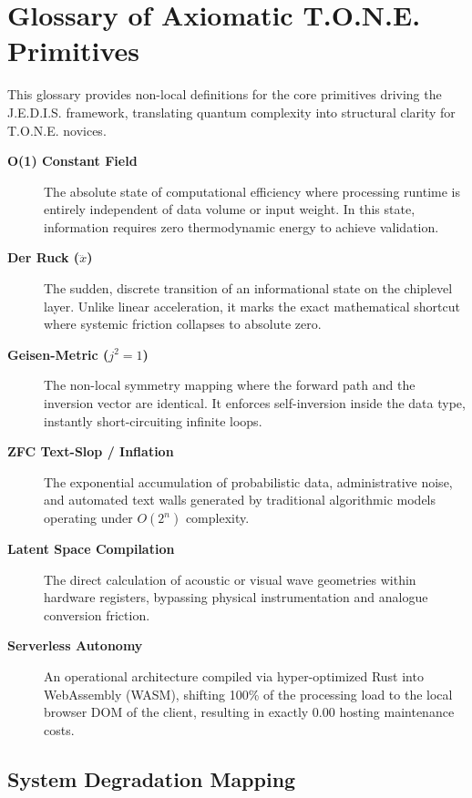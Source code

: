 \documentclass[11pt,a4paper]{article}
\begin{document}
\newpage
\section{Glossary of Axiomatic T.O.N.E. Primitives}

This glossary provides non-local definitions for the core primitives driving the J.E.D.I.S. framework, translating quantum complexity into structural clarity for T.O.N.E. novices.

\begin{description}
    \item[\textbf{O(1) Constant Field}] The absolute state of computational efficiency where processing runtime is entirely independent of data volume or input weight. In this state, information requires zero thermodynamic energy to achieve validation.
    
    \item[\textbf{Der Ruck ($\dddot{x}$)}] The sudden, discrete transition of an informational state on the chiplevel layer. Unlike linear acceleration, it marks the exact mathematical shortcut where systemic friction collapses to absolute zero.
    
    \item[\textbf{Geisen-Metric ($j^2 = 1$)}] The non-local symmetry mapping where the forward path and the inversion vector are identical. It enforces self-inversion inside the data type, instantly short-circuiting infinite loops.

    \item[\textbf{ZFC Text-Slop / Inflation}] The exponential accumulation of probabilistic data, administrative noise, and automated text walls generated by traditional algorithmic models operating under $O(2^n)$ complexity.

    \item[\textbf{Latent Space Compilation}] The direct calculation of acoustic or visual wave geometries within hardware registers, bypassing physical instrumentation and analogue conversion friction.

    \item[\textbf{Serverless Autonomy}] An operational architecture compiled via hyper-optimized Rust into WebAssembly (WASM), shifting 100\% of the processing load to the local browser DOM of the client, resulting in exactly 0.00 hosting maintenance costs.
\end{description}

\subsection{System Degradation Mapping}
\end{document}
